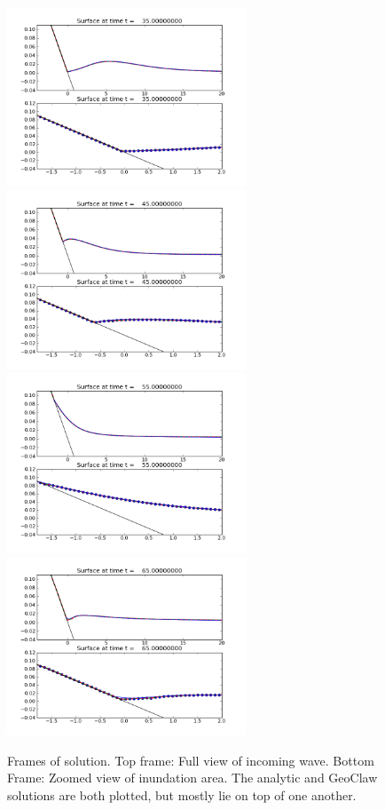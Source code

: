 \begin{figure}[ht]
\hfil\includegraphics[width=2.8in]{bp1/frame0001fig2.png}\hfil
\hfil\includegraphics[width=2.8in]{bp1/frame0003fig2.png}\hfil
\vskip 5pt
\hfil\includegraphics[width=2.8in]{bp1/frame0005fig2.png}\hfil
\hfil\includegraphics[width=2.8in]{bp1/frame0007fig2.png}\hfil
\caption{\label{fig:bp1frames} 
Frames of solution. Top frame: Full view of incoming wave. Bottom Frame: Zoomed
view of inundation area. The analytic and GeoClaw solutions are both
plotted, but mostly lie on top of one another.}
\end{figure}

